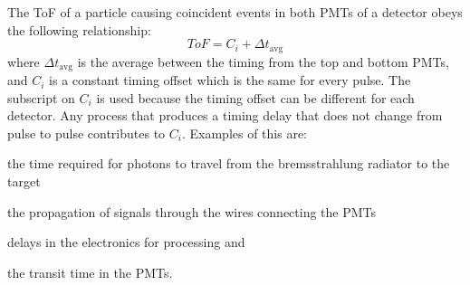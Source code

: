 The ToF of a particle causing coincident events in both PMTs of a detector obeys the following relationship:
\begin{displaymath}
ToF = C_i + \Delta t_{\text{avg}} 
\end{displaymath}
where $\Delta t_{\text{avg}} $ is the average between the timing from the top and bottom PMTs, and $C_i$ is a constant timing offset which is the same for every pulse.
The subscript on $C_i$ is used because the timing offset can be different for each detector.
Any process that produces a timing delay that does not change from pulse to pulse contributes to $C_{i}$.
Examples of this are: \begin{enumerate*}[font={\color{red!50!black}\bfseries}]
\item the time required for photons to travel from the bremsstrahlung radiator to the target
\item the propagation of signals through the wires connecting the PMTs
\item delays in the electronics for processing and
\item the transit time in the PMTs.
\end{enumerate*}

